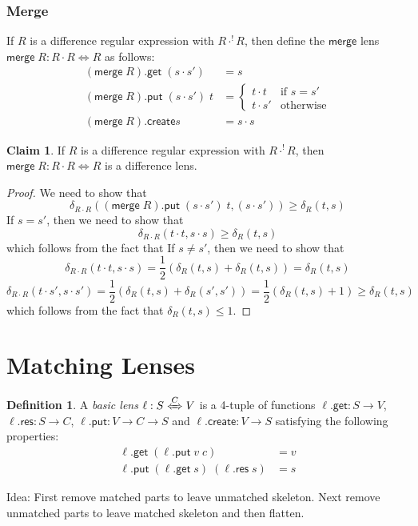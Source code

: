 \documentclass[acmsmall,review,anonymous]{acmart}\settopmatter{printfolios=true,printccs=false,printacmref=false}
\theoremstyle{definition}
\newtheorem{definition}{Definition}
\newtheorem{claim}{Claim}
\newcommand{\kw}[1]{\ensuremath{\mathsf{#1}}\xspace}
\newcommand{\get}{\ensuremath{\kw{get}}\xspace}
\newcommand{\pput}{\ensuremath{\kw{put}}\xspace}
\newcommand{\create}{\ensuremath{\kw{create}}\xspace}
\newcommand{\res}{\ensuremath{\kw{res}}\xspace}
\newcommand{\mergelens}{\ensuremath{\kw{merge}}\xspace}
\begin{document}
\subsubsection{Merge}
If $R$ is a difference regular expression with $R \cdot^! R$, then define the \mergelens lens $\mergelens \; R : R \cdot R \Leftrightarrow R$ as follows:
\begin{align*}
(\mergelens \; R).\get \; (s \cdot s') &= s\\
(\mergelens \; R).\pput \; (s \cdot s') \; t &= 
\begin{cases}
t \cdot t & \text{if }s = s'\\
t \cdot s' & \text{otherwise}
\end{cases}\\
(\mergelens \; R).\create s &= s \cdot s
\end{align*}
\begin{claim}
If $R$ is a difference regular expression with $R \cdot^! R$, then $\mergelens \; R : R \cdot R \Leftrightarrow R$ is a difference lens.
\end{claim}
\begin{proof}
We need to show that
$$\delta_{R \cdot R}((\mergelens \; R).\pput \; (s \cdot s') \; t, (s \cdot s')) \geq \delta_R(t, s)$$
If $s = s'$, then we need to show that
$$\delta_{R \cdot R}(t \cdot t, s \cdot s) \geq \delta_R(t, s)$$
which follows from the fact that
If $s \neq s'$, then we need to show that
$$\delta_{R \cdot R}(t \cdot t, s \cdot s) = \frac{1}{2}\left(\delta_R(t, s) + \delta_R(t, s)\right) = \delta_R(t, s)$$
$$\delta_{R \cdot R}(t \cdot s', s \cdot s') = \frac{1}{2}\left(\delta_R(t, s) + \delta_R(s', s')\right) = \frac{1}{2}\left(\delta_R(t, s) + 1\right) \geq \delta_R(t, s)$$
which follows from the fact that $\delta_R(t, s) \leq 1$.
\end{proof}
\iffalse
\section{Matching Lenses}
\begin{definition}
A {\em basic lens} $\ell : S \xLeftrightarrow{C} V$ is a 4-tuple of functions
$\ell.\get : S \longrightarrow V$, $\ell.\res : S \longrightarrow C$,
$\ell.\pput : V \longrightarrow C \longrightarrow S$ and $\ell.\create : V
\longrightarrow S$ satisfying the following properties:
\begin{align*}
\ell.\get \; (\ell.\pput \; v \; c) &= v \tag{PUTGET}\\
\ell.\pput \; (\ell.\get \; s) \; (\ell.\res \; s) &= s \tag{GETPUT}
\end{align*}
\end{definition}
Idea: First remove matched parts to leave unmatched skeleton. Next remove
unmatched parts to leave matched skeleton and then flatten.
\end{document}

